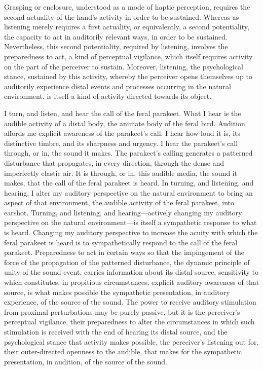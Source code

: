 Grasping or enclosure, understood as a mode of haptic perception, requires the second actuality of the hand's activity in order to be sustained. Whereas as listening merely requires a first actuality, or equivalently, a second potentiality, the capacity to act in auditorily relevant ways, in order to be sustained. Nevertheless, this second potentiality, required by listening, involves the preparedness to act, a kind of perceptual vigilance, which itself requires activity on the part of the perceiver to sustain. Moreover, listening, the psychological stance, sustained by this activity, whereby the perceiver opens themselves up to auditorily experience distal events and processes occurring in the natural environment, is itself a kind of activity directed towards its object.

I turn, and listen, and hear the call of the feral parakeet. What I hear is the audible activity of a distal body, the animate body of the feral bird. Audition affords me explicit awareness of the parakeet's call. I hear how loud it is, its distinctive timbre, and its sharpness and urgency. I hear the parakeet's call through, or in, the sound it makes. The parakeet's calling generates a patterned disturbance that propagates, in every direction, through the dense and imperfectly elastic air. It is through, or in, this audible media, the sound it makes, that the call of the feral parakeet is heard. In turning, and listening, and hearing, I alter my auditory perspective on the natural environment to bring an aspect of that environment, the audible activity of the feral parakeet, into earshot. Turning, and listening, and hearing---actively changing my auditory perspective on the natural environment---is itself a sympathetic response to what is heard. Changing my auditory perspective to increase the acuity with which the feral parakeet is heard is to sympathetically respond to the call of the feral parakeet. Preparedness to act in certain ways so that the impingement of the force of the propagation of the patterned disturbance, the dynamic principle of unity of the sound event, carries information about its distal source, sensitivity to which constitutes, in propitious circumstances, explicit auditory awareness of that source, is what makes possible the sympathetic presentation, in auditory experience, of the source of the sound. The power to receive auditory stimulation from proximal perturbations may be purely passive, but it is the perceiver's perceptual vigilance, their preparedness to alter the circumstances in which such stimulation is received with the end of hearing its distal source, and the psychological stance that activity makes possible, the perceiver's listening out for, their outer-directed openness to the audible, that makes for the sympathetic presentation, in audition, of the source of the sound.


